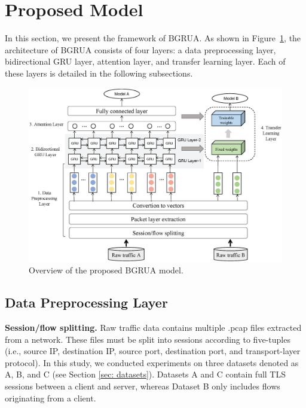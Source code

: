 \documentclass[preprint,12pt]{elsarticle}
\begin{document}
\setcounter{figure}{2}
\setcounter{table}{2}
\section{Proposed Model}
In this section, we present the framework of BGRUA. As shown in Figure~\ref{fig3}, the architecture of BGRUA consists of four layers: a data preprocessing layer, bidirectional GRU layer, attention layer, and transfer learning layer. Each of these layers is detailed in the following subsections.


\begin{figure}[!t]
\includegraphics[width=\textwidth]{overview.eps}
\caption{Overview of the proposed BGRUA model.} \label{fig3}
\end{figure}

\subsection{Data Preprocessing Layer}
\noindent\textbf{Session/flow splitting.} 
Raw traffic data contains multiple .pcap files extracted from a network. These files must be split into sessions according to five-tuples (i.e., source IP, destination IP, source port, destination port, and transport-layer protocol). In this study, we conducted experiments on three datasets denoted as A, B, and C (see Section \ref{sec: datasets}). Datasets A and C contain full TLS sessions between a client and server, whereas Dataset B only includes flows originating from a client.
\end{document}
